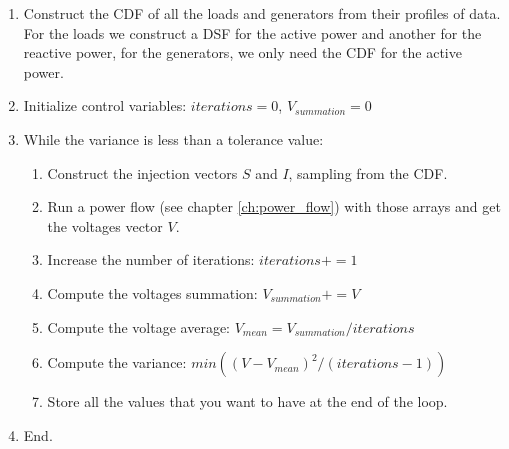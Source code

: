 \documentclass[nols,a4paper,twoside,notoc,fleqn]{tufte-book}
\begin{document}
\begin{enumerate}
	\item Construct the CDF of all the loads and generators from their profiles of data. For the loads we construct a DSF for the active power and another for the reactive power, for the generators, we only need the CDF for the active power.
	
	\item Initialize control variables: $iterations = 0$, ${V}_{summation} = 0$
	
	\item While the variance is less than a tolerance value:
	
	\begin{enumerate}
		\item Construct the injection vectors $S$ and $I$, sampling from the CDF.
		
		\item Run a power flow (see chapter \ref{ch:power_flow}) with those arrays and get the voltages vector ${V}$.
		
		\item Increase the number of iterations: $iterations += 1$
		
		\item Compute the voltages summation: ${V}_{summation} += {V}$
		
		\item Compute the voltage average: ${V}_{mean} = {V}_{summation} / iterations$
		
		\item Compute the variance: $min(({V} - {V}_{mean})^2 / (iterations - 1))$
		
		\item Store all the values that you want to have at the end of the loop.
		
	\end{enumerate}

	\item End.
\end{enumerate}










\end{document}
